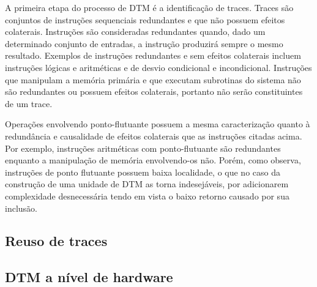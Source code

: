 A primeira etapa do processo de DTM é a identificação de traces. Traces são conjuntos de instruções sequenciais redundantes e que não possuem efeitos colaterais. Instruções são consideradas redundantes quando, dado um determinado conjunto de entradas, a instrução produzirá sempre o mesmo resultado. Exemplos de instruções redundantes e sem efeitos colaterais incluem instruções lógicas e aritméticas e de desvio condicional e incondicional. Instruções que manipulam a memória primária e que executam subrotinas do sistema não são redundantes ou possuem efeitos colaterais, portanto não serão constituintes de um trace.

Operações envolvendo ponto-flutuante possuem a mesma caracterização quanto à redundância e causalidade de efeitos colaterais que as instruções citadas acima. Por exemplo, instruções aritméticas com ponto-flutuante são redundantes enquanto a manipulação de memória envolvendo-os não. Porém, como  observa, instruções de ponto flutuante possuem baixa localidade, o que no caso da construção de uma unidade de DTM as torna indesejáveis, por adicionarem complexidade desnecessária tendo em vista o baixo retorno causado por sua inclusão.

\subsection{Reuso de traces}
\label{Fundamentacao:DTM:Reuso}

\subsection{DTM a nível de hardware}
\label{Fundamentacao:DTM:Hardware}


